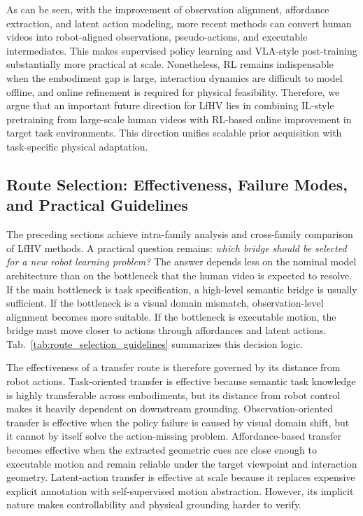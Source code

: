 \documentclass[Afour,sageh,times]{sagej}
\begin{document}
As can be seen, with the improvement of observation alignment, affordance extraction, and latent action modeling, more recent methods can convert human videos into robot-aligned observations, pseudo-actions, and executable intermediates. This makes supervised policy learning and VLA-style post-training substantially more practical at scale. Nonetheless, RL remains indispensable when the embodiment gap is large, interaction dynamics are difficult to model offline, and online refinement is required for physical feasibility. Therefore, we argue that an important future direction for LfHV lies in combining IL-style pretraining from large-scale human videos with RL-based online improvement in target task environments. This direction unifies scalable prior acquisition with task-specific physical adaptation.



\subsection{Route Selection: Effectiveness, Failure Modes, and Practical Guidelines}
\label{sec:route_selection}

The preceding sections achieve intra-family analysis and cross-family comparison of LfHV methods. A practical question remains: \textit{which bridge should be selected for a new robot learning problem?} The answer depends less on the nominal model architecture than on the bottleneck that the human video is expected to resolve. If the main bottleneck is task specification, a high-level semantic bridge is usually sufficient. If the bottleneck is a visual domain mismatch, observation-level alignment becomes more suitable. If the bottleneck is executable motion, the bridge must move closer to actions through affordances and latent actions. Tab.~\ref{tab:route_selection_guidelines} summarizes this decision logic.



The effectiveness of a transfer route is therefore governed by its distance from robot actions. Task-oriented transfer is effective because semantic task knowledge is highly transferable across embodiments, but its distance from robot control makes it heavily dependent on downstream grounding. Observation-oriented transfer is effective when the policy failure is caused by visual domain shift, but it cannot by itself solve the action-missing problem. Affordance-based transfer becomes effective when the extracted geometric cues are close enough to executable motion and remain reliable under the target viewpoint and interaction geometry. Latent-action transfer is effective at scale because it replaces expensive explicit annotation with self-supervised motion abstraction. However, its implicit nature makes controllability and physical grounding harder to verify.
\end{document}
